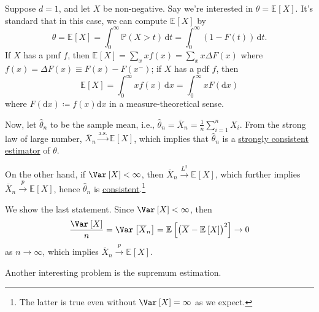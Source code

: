 \begin{eg}
	Suppose \(d = 1\), and let \(X\) be non-negative. Say we're interested in \(\theta = \mathbb{E}_{}\left[X \right] \). It's standard that in this case, we can compute \(\mathbb{E}_{}\left[X \right] \) by
	\[
		\theta
		= \mathbb{E}_{}\left[X \right]
		= \int_{0}^{\infty} \mathbb{P} (X > t) \,\mathrm{d}t
		= \int_{0}^{\infty} (1 - F(t)) \,\mathrm{d}t.
	\]
	If \(X\) has a pmf \(f\), then \(\mathbb{E}_{}\left[X \right] = \sum_{x} x f(x) = \sum_{x} x \Delta F(x)\) where \(f(x) = \Delta F(x) \equiv F(x) - F(x^-)\); if \(X\) has a pdf \(f\), then
	\[
		\mathbb{E}_{}\left[X \right]
		= \int_{0}^{\infty} x f(x) \,\mathrm{d}x
		= \int_{0}^{\infty} x F(\mathrm{d}x)
	\]
	where \(F(\mathrm{d} x) \coloneqq f(x) \mathrm{d} x\) in a measure-theoretical sense.

	Now, let \(\hat{\theta} _n\) to be the sample mean, i.e., \(\hat{\theta} _n = \overline{X} _n = \frac{1}{n} \sum_{i=1}^{n} X_i\). From the strong law of large number, \(\overline{X} _n \overset{\text{a.s.} }{\to } \mathbb{E}_{}\left[ X \right] \), which implies that \(\hat{\theta} _n\) is a \hyperref[def:strongly-consistent]{strongly consistent estimator} of \(\theta \).

	On the other hand, if \(\Var_{}\left[X \right] < \infty \), then \(\overline{X} _n \overset{L^2}{\to } \mathbb{E}_{}\left[X \right] \), which further implies \(\overline{X} _n \overset{p}{\to } \mathbb{E}_{}\left[X \right] \), hence \(\hat{\theta} _n\) is \hyperref[def:consistent]{consistent}.\footnote{The latter is true even without \(\Var_{}\left[X \right] = \infty \) as we expect.}
\end{eg}
\begin{explanation}
	We show the last statement. Since \(\Var_{}\left[X \right] < \infty \), then
	\[
		\frac{\Var_{}\left[X \right] }{n}
		= \Var_{}\left[\overline{X} _n \right]
		= \mathbb{E}_{}\left[ \left( \overline{X} - \mathbb{E}_{}\left[X \right]  \right) ^2 \right]
		\to 0
	\]
	as \(n \to \infty \), which implies \(\overline{X} _n \overset{p}{\to } \mathbb{E}_{}\left[X \right] \).
\end{explanation}

Another interesting problem is the supremum estimation.

